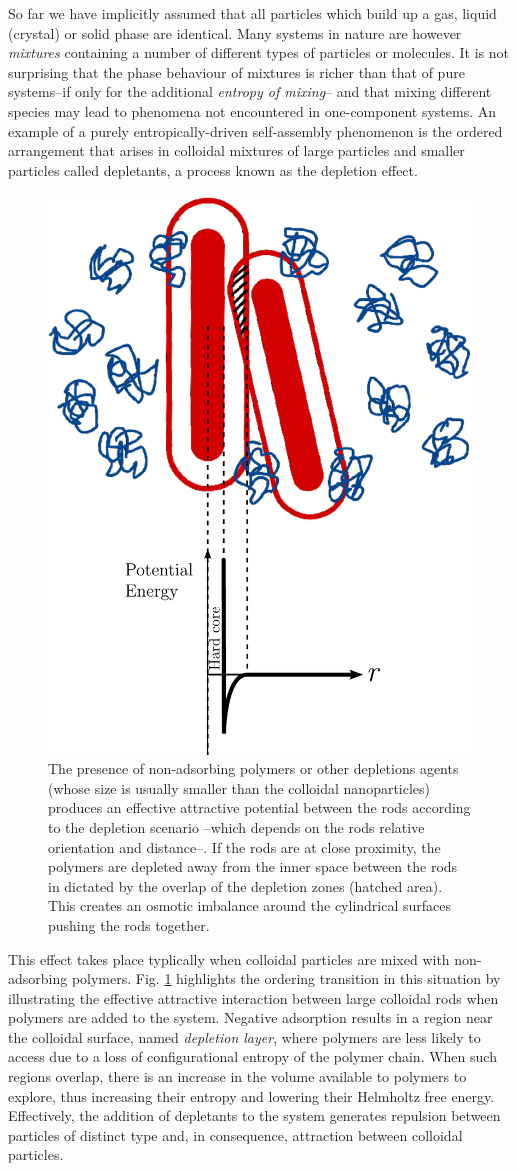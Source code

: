 So far we have implicitly assumed that all particles which build up a gas, liquid (crystal) or solid phase are identical. Many systems in nature are however {\em mixtures} containing a number of different types of particles or molecules. It is not surprising that the phase behaviour of mixtures is richer than that of pure systems--if only for the additional {\em entropy of mixing}-- and that mixing different species may lead to  phenomena not encountered in one-component systems. An example of a purely entropically-driven self-assembly phenomenon is the ordered arrangement that arises in colloidal mixtures of large particles and smaller particles called depletants, a process known as the depletion effect.

\begin{figure}
\includegraphics[width= 0.4 \columnwidth]{figures/chapter-1/depletion}
\caption{ \label{introfig2} The presence of non-adsorbing polymers or other depletions agents (whose size is usually smaller than the colloidal nanoparticles) produces an effective attractive potential between the rods according to the depletion scenario --which depends on the rods relative orientation and distance--. If the rods are at close proximity, the polymers are depleted away from the inner space between the rods in dictated by the overlap of the depletion zones (hatched area). This creates an osmotic imbalance around the cylindrical surfaces pushing the rods together.  }
\end{figure}

This effect takes place typlically when colloidal particles are mixed with non-adsorbing polymers. Fig. \ref{introfig2} highlights the ordering transition in this situation by illustrating the effective attractive interaction between large colloidal rods when polymers are added to the system. Negative adsorption results in a region near the colloidal surface, named {\em depletion layer}, where polymers are less likely to access due to a loss of configurational entropy of the polymer chain. When such regions overlap, there is an increase in the volume available to polymers to explore, thus increasing their entropy and lowering their Helmholtz free energy. Effectively, the addition of depletants to the system generates repulsion between particles of distinct type and, in consequence, attraction between colloidal particles.

